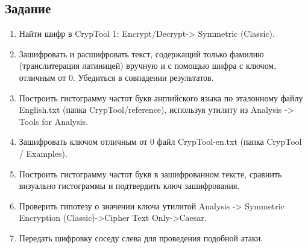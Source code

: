 \documentclass[a4paper, 14pt]{extarticle}
\begin{document}
\subsection{Задание}
\begin{enumerate}
    \item Найти шифр в CrypTool 1: Encrypt/Decrypt-> Symmetric (Classic).
    \item Зашифровать и расшифровать текст, содержащий только фамилию (транслитерация латиницей) вручную и с помощью шифра с ключом, отличным от 0. Убедиться в совпадении результатов.
    \item Построить гистограмму частот букв английского языка по эталонному файлу English.txt (папка CrypTool/reference), используя утилиту из Analysis -> Tools for Analysis.
    \item Зашифровать ключом отличным от 0 файл CrypTool-en.txt (папка CrypTool / Examples).
    \item  Построить гистограмму частот букв в зашифрованном тексте, сравнить визуально гистограммы и подтвердить ключ зашифрования.
    \item Проверить гипотезу о значении ключа утилитой Analysis -> Symmetric Encryption (Classic)->Cipher Text Only->Caesar.
    \item Передать шифровку соседу слева для проведения подобной атаки.
\end{enumerate}
\end{document}
